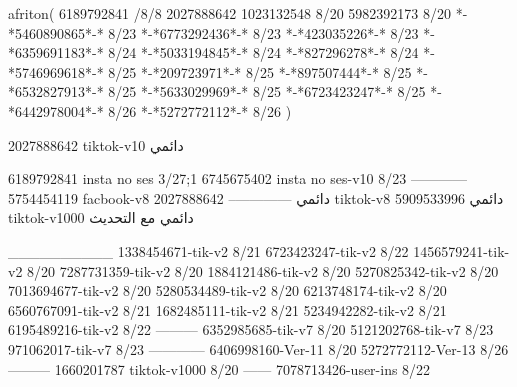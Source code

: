 afriton(
6189792841 /8/8
2027888642
1023132548 8/20
5982392173 8/20
*-*5460890865*-* 8/23
*-*6773292436*-* 8/23
*-*423035226*-* 8/23
*-*6359691183*-* 8/24
*-*5033194845*-* 8/24
*-*827296278*-* 8/24
*-*5746969618*-* 8/25
*-*209723971*-* 8/25
*-*897507444*-* 8/25
*-*6532827913*-* 8/25
*-*5633029969*-* 8/25
*-*6723423247*-* 8/25
*-*6442978004*-* 8/26
*-*5272772112*-* 8/26
)

2027888642 tiktok-v10
دائمي

6189792841 insta no ses
3/27;1
6745675402 insta no ses-v10
8/23
------------
5754454119 facbook-v8
دائمي
--------------
2027888642 tiktok-v8
دائمي
5909533996 tiktok-v1000
دائمي مع التحديث

__________
1338454671-tik-v2
8/21
6723423247-tik-v2
8/22
1456579241-tik-v2
8/20
7287731359-tik-v2
8/20
1884121486-tik-v2
8/20
5270825342-tik-v2
8/20
7013694677-tik-v2
8/20
5280534489-tik-v2
8/20
6213748174-tik-v2
8/20
6560767091-tik-v2
8/21
1682485111-tik-v2
8/21
5234942282-tik-v2
8/21
6195489216-tik-v2
8/22
---------
6352985685-tik-v7
8/20
5121202768-tik-v7
8/23
971062017-tik-v7
8/23
------------
6406998160-Ver-11
8/20
5272772112-Ver-13
8/26
---------
1660201787 tiktok-v1000
8/20
------
7078713426-user-ins
8/22
